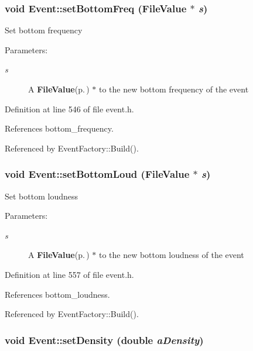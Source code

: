 \subsubsection{\setlength{\rightskip}{0pt plus 5cm}void Event::set\-Bottom\-Freq ({\bf File\-Value} $\ast$ {\em s})\hspace{0.3cm}{\tt  [inline]}}\label{classEvent_a61}


Set bottom frequency \begin{Desc}
\item[Parameters:]
\begin{description}
\item[{\em s}]A {\bf File\-Value}{\rm (p.\,\pageref{classFileValue})} $\ast$ to the new bottom frequency of the event \end{description}
\end{Desc}


Definition at line 546 of file event.h.

References bottom\_\-frequency.

Referenced by Event\-Factory::Build().
\subsubsection{\setlength{\rightskip}{0pt plus 5cm}void Event::set\-Bottom\-Loud ({\bf File\-Value} $\ast$ {\em s})\hspace{0.3cm}{\tt  [inline]}}\label{classEvent_a63}


Set bottom loudness \begin{Desc}
\item[Parameters:]
\begin{description}
\item[{\em s}]A {\bf File\-Value}{\rm (p.\,\pageref{classFileValue})} $\ast$ to the new bottom loudness of the event \end{description}
\end{Desc}


Definition at line 557 of file event.h.

References bottom\_\-loudness.

Referenced by Event\-Factory::Build().
\subsubsection{\setlength{\rightskip}{0pt plus 5cm}void Event::set\-Density (double {\em a\-Density})\hspace{0.3cm}{\tt  [virtual]}}\label{classEvent_a11}


